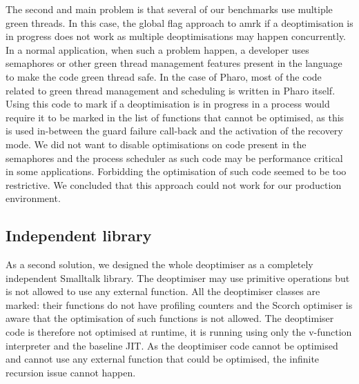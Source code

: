 \documentclass[a4paper,12pt,twoside]{../includes/ThesisStyle}
\begin{document}
The second and main problem is that several of our benchmarks use multiple green threads. In this case, the global flag approach to amrk if a deoptimisation is in progress does not work as multiple deoptimisations may happen concurrently. In a normal application, when such a problem happen, a developer uses semaphores or other green thread management features present in the language to make the code green thread safe. In the case of Pharo, most of the code related to green thread management and scheduling is written in Pharo itself. Using this code to mark if a deoptimisation is in progress in a process would require it to be marked in the list of functions that cannot be optimised, as this is used in-between the guard failure call-back and the activation of the recovery mode. We did not want to disable optimisations on code present in the semaphores and the process scheduler as such code may be performance critical in some applications. Forbidding the optimisation of such code seemed to be too restrictive. We concluded that this approach could not work for our production environment.

\subsection{Independent library}

As a second solution, we designed the whole deoptimiser as a completely independent Smalltalk library. The deoptimiser may use primitive operations but is not allowed to use any external function. All the deoptimiser classes are marked: their functions do not have profiling counters and the Scorch optimiser is aware that the optimisation of such functions is not allowed. The deoptimiser code is therefore not optimised at runtime, it is running using only the v-function interpreter and the baseline JIT. As the deoptimiser code cannot be optimised and cannot use any external function that could be optimised, the infinite recursion issue cannot happen.
\end{document}
